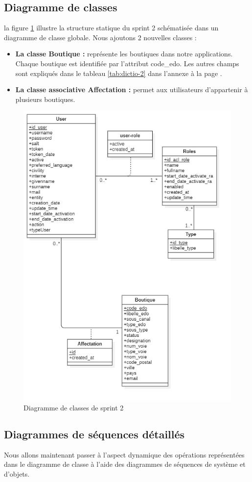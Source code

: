 \subsection{Diagramme de classes}
la figure \ref{fig:classdiag-sprint2} illustre la structure statique du sprint 2 schématisée dans un diagramme de classe globale.
Nous ajoutons 2 nouvelles classes :
\begin{itemize}
	\item \textbf{La classe Boutique :} représente les boutiques dans notre applications. Chaque boutique est identifiée par l'attribut code\_edo. Les autres champs sont expliqués dans le tableau \ref{tab:dictio-2} dans l'annexe à la page \pageref{tab:dictio-2}.
	\item \textbf{La classe associative Affectation : } permet aux utilisateurs d'appartenir à plusieurs boutiques.
\end{itemize}
\begin{figure}[H]
	\centering
	\includegraphics[width=0.5\linewidth]{img/conception/classes/ClassDiag-sprint2}
	\caption[Diagramme de classes de sprint 2]{Diagramme de classes de sprint 2}
	\label{fig:classdiag-sprint2}
\end{figure}

\subsection{Diagrammes de séquences détaillés}
Nous allons maintenant passer à l’aspect dynamique des opérations représentées dans le diagramme de classe à l’aide des diagrammes de séquences de système et d’objets.
